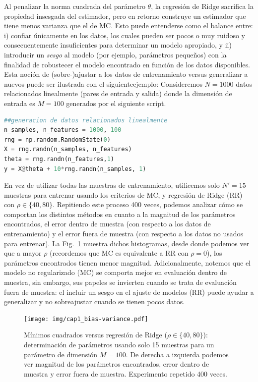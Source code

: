 Al penalizar la norma cuadrada del parámetro $\theta$, la regresión de Ridge sacrifica la propiedad insesgada del estimador, pero en retorno construye un estimador que tiene menos varianza que el de MC. Esto puede entenderse como el balance entre: i) confiar únicamente en los datos, los cuales pueden ser pocos o muy ruidoso y consecuentemente insuficientes para determinar un modelo apropiado, y ii) introducir un \emph{sesgo} al modelo (por ejemplo, parámetros pequeños) con la finalidad de robustecer el modelo encontrado en función de los datos disponibles. Esta noción de (sobre-)ajustar a los datos de entrenamiento versus generalizar a  nuevos  puede ser ilustrada con el siguienteejemplo: Consideremos $N=1000$ datos relacionados linealmente (pares de entrada y salida) donde la dimensión de entrada es $M=100$ generados por el siguiente script.
\begin{lstlisting}[language=Python]
##generacion de datos relacionados linealmente 
n_samples, n_features = 1000, 100
rng = np.random.RandomState(0)
X = rng.randn(n_samples, n_features)
theta = rng.randn(n_features,1)
y = X@theta + 10*rng.randn(n_samples, 1)
\end{lstlisting}
 En vez de utilizar todas las muestras de entrenamiento, utilicemos solo $N'=15$ muestras para entrenar usando los criterios de MC, y regresión de Ridge (RR) con $\rho\in\{40,80\}$. Repitiendo este proceso 400 veces, podemos analizar cómo se comportan los distintos métodos en cuanto a la magnitud de los parámetros encontrados, el error dentro de muestra (con respecto a los datos de entrenamiento) y el error fuera de muestra (con respecto a los datos no usados para entrenar). La Fig.~\ref{fig:MCvsRR_Synth} muestra dichos histogramas, desde donde podemos ver que a mayor $\rho$ (recordemos que MC es equivalente a RR con $\rho=0$), los parámetros encontrados tienen menor magnitud. Adicionalmente, notemos que el modelo no regularizado (MC) se comporta mejor en evaluación dentro de muestra, sin embargo, sus papeles se invierten cuando se trata de evaluación fuera de muestra: el incluir un sesgo en el ajuste de modelos (RR) puede ayudar a generalizar y no sobreajustar cuando se tienen pocos datos. 

 \begin{figure}[H]
	\centering
	\texttt{[image: img/cap1\_bias-variance.pdf]}\\
	\caption{Mínimos cuadrados versus regresión de Ridge ($\rho\in\{40,80\}$): determinación de parámetros usando solo 15 muestras para un parámetro de dimensión $M=100$. De derecha a izquierda podemos ver magnitud de los parámetros encontrados, error dentro de muestra y error fuera de muestra. Experimento repetido 400 veces.}
	\label{fig:MCvsRR_Synth}  
\end{figure}



